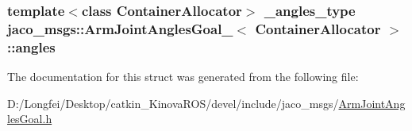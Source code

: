 \subsubsection[{\texorpdfstring{angles}{angles}}]{\setlength{\rightskip}{0pt plus 5cm}template$<$class Container\+Allocator$>$ {\bf \+\_\+angles\+\_\+type} {\bf jaco\+\_\+msgs\+::\+Arm\+Joint\+Angles\+Goal\+\_\+}$<$ Container\+Allocator $>$\+::angles}\hypertarget{structjaco__msgs_1_1ArmJointAnglesGoal___a21e055168ea5ac7f6ddf1746c48f315a}{}\label{structjaco__msgs_1_1ArmJointAnglesGoal___a21e055168ea5ac7f6ddf1746c48f315a}


The documentation for this struct was generated from the following file\+:\begin{DoxyCompactItemize}
\item 
D\+:/\+Longfei/\+Desktop/catkin\+\_\+\+Kinova\+R\+O\+S/devel/include/jaco\+\_\+msgs/\hyperlink{ArmJointAnglesGoal_8h}{Arm\+Joint\+Angles\+Goal.\+h}\end{DoxyCompactItemize}
